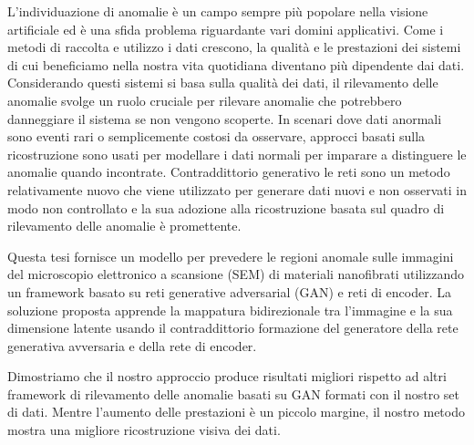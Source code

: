 
\begingroup

L'individuazione di anomalie è un campo sempre più popolare nella visione artificiale ed è una sfida
problema riguardante vari domini applicativi. Come i metodi di raccolta e utilizzo
i dati crescono, la qualità e le prestazioni dei sistemi di cui beneficiamo nella nostra vita quotidiana diventano
più dipendente dai dati. Considerando questi sistemi si basa sulla qualità dei dati, il rilevamento delle anomalie
svolge un ruolo cruciale per rilevare anomalie che potrebbero danneggiare il sistema se non vengono scoperte. In scenari dove
dati anormali sono eventi rari o semplicemente costosi da osservare, approcci basati sulla ricostruzione
sono usati per modellare i dati normali per imparare a distinguere le anomalie quando incontrate. Contraddittorio generativo
le reti sono un metodo relativamente nuovo che viene utilizzato per generare dati nuovi e non osservati in modo non controllato e
la sua adozione alla ricostruzione basata sul quadro di rilevamento delle anomalie è promettente.

Questa tesi fornisce un modello per prevedere le regioni anomale sulle immagini del microscopio elettronico a scansione (SEM)
di materiali nanofibrati utilizzando un framework basato su reti generative adversarial (GAN) e reti di encoder.
La soluzione proposta apprende la mappatura bidirezionale tra l'immagine e la sua dimensione latente usando il contraddittorio
formazione del generatore della rete generativa avversaria e della rete di encoder.

Dimostriamo che il nostro approccio produce risultati migliori rispetto ad altri framework di rilevamento delle anomalie basati su GAN formati con il nostro
set di dati. Mentre l'aumento delle prestazioni è un piccolo margine, il nostro metodo mostra una migliore ricostruzione visiva dei dati.
\endgroup